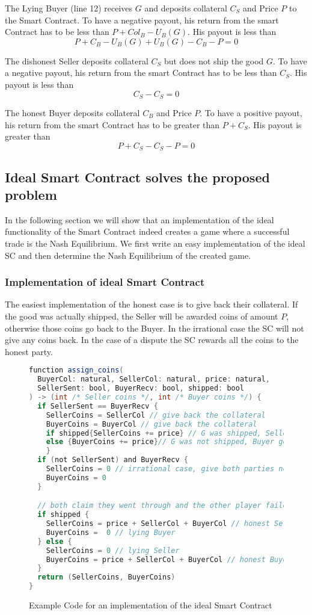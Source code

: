 \documentclass{cacthesis}
\begin{document}
The Lying Buyer (line 12) receives $G$ and deposits collateral $C_S$ and Price $P$ to the Smart Contract. To have a negative payout, his return from the smart Contract has to be less than $P + Col_B - U_B(G)$. His payout is less than
\[P + C_B - U_B(G) + U_B(G) - C_B -P = 0\]

The dishonest Seller deposits collateral $C_S$ but does not ship the good $G$. To have a negative payout, his return from the smart Contract has to be less than $C_S$. His payout is less than
\[C_S - C_S = 0\]

The honest Buyer deposits collateral $C_B$ and Price $P$. To have a positive payout, his return from the smart Contract has to be greater than $P + C_S$. His payout is greater than
\[P + C_S - C_S - P = 0\]

\subsection{Ideal Smart Contract solves the proposed problem}
In the following section we will show that an implementation of the ideal functionality of the Smart Contract indeed creates a game where a successful trade is the Nash Equilibrium. We first write an easy implementation of the ideal SC and then determine the Nash Equilibrium of the created game.
\subsubsection{Implementation of ideal Smart Contract}
The easiest implementation of the honest case is to give back their collateral. If the good was actually shipped, the Seller will be awarded coins of amount $P$, otherwise those coins go back to the Buyer.
In the irrational case the SC will not give any coins back.
In the case of a dispute the SC rewards all the coins to the honest party.

\begin{figure}[htb!]
    \centering
\begin{lstlisting}[language=java]
function assign_coins(
  BuyerCol: natural, SellerCol: natural, price: natural,
  SellerSent: bool, BuyerRecv: bool, shipped: bool
) -> (int /* Seller coins */, int /* Buyer coins */) {
  if SellerSent == BuyerRecv { 
    SellerCoins = SellerCol // give back the collateral
    BuyerCoins = BuyerCol // give back the collateral
    if shipped{SellerCoins += price} // G was shipped, Seller gets price
    else {BuyerCoins += price}// G was not shipped, Buyer gets price
    }
  if (not SellerSent) and BuyerRecv { 
    SellerCoins = 0 // irrational case, give both parties no coins
    BuyerCoins = 0
  }

  // both claim they went through and the other player failed
  if shipped {
    SellerCoins = price + SellerCol + BuyerCol // honest Seller
    BuyerCoins =  0 // lying Buyer
  } else {
    SellerCoins = 0 // lying Seller
    BuyerCoins = price + SellerCol + BuyerCol // honest Buyer
  }
  return (SellerCoins, BuyerCoins)
}
\end{lstlisting}
    \caption{Example Code for an implementation of the ideal Smart Contract}
\end{figure}
\end{document}
